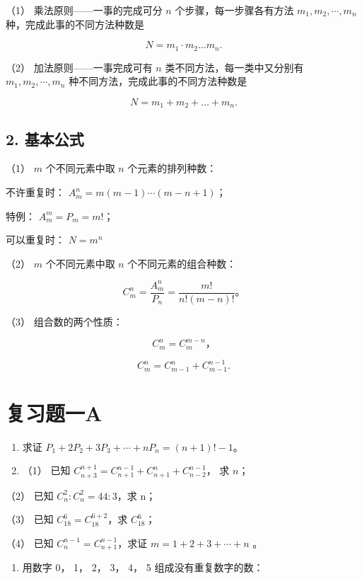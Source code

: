 （1） 乘法原则------一事的完成可分 \(n\) 个步骤，每一步骤各有方法
\(m_{1}, m_{2}, \cdots, m_{n}\) 种，完成此事的不同方法种数是

\[
N = m _ {1} \cdot m _ {2} \dots m _ {n}.
\]

（2） 加法原则------一事完成可有 \(n\) 类不同方法，每一类中又分别有
\(m_{1}, m_{2}, \cdots, m_{n}\) 种不同方法，完成此事的不同方法种数是

\[
N = m _ {1} + m _ {2} + \dots + m _ {n}.
\]

\subsection{2. 基本公式}

（1） \(m\) 个不同元素中取 \(n\) 个元素的排列种数：

不许重复时： \(A_{m}^{n}=m(m-1)\cdots(m-n+1)\)；

特例： \(A_{m}^{m}=P_{m}=m!\)；

可以重复时： \(N = m^n\)

（2） \(m\) 个不同元素中取 \(n\) 个不同元素的组合种数：

\[
C_m^n=\frac{A_m^n}{P_n}=\frac{m!}{n!(m-n)!}\text{。}
\]

（3） 组合数的两个性质：

\[
C _ {m} ^ {n} = C _ {m} ^ {m - n}\text{，}
\]

\[
C _ {m} ^ {n} = C _ {m - 1} ^ {n} + C _ {m - 1} ^ {n - 1}.
\]

\section{复习题一A}

\begin{enumerate}
\item
  求证 \(P_{1} + 2P_{2} + 3P_{3} + \cdots + nP_{n} = (n + 1)! - 1\)。
\item
  （1） 已知
  \(C_{n+3}^{n+1} = C_{n+1}^{n-1} + C_{n+1}^{n} + C_{n-2}^{n-1}\)， 求
  \(n\)；
\end{enumerate}

（2） 已知 \(C_{n}^{2}:C_{n}^{2}=44:3\)，求 n；

（3） 已知 \(C_{18}^{6}=C_{18}^{6+2}\)，求 \(C_{18}^{6}\)；

（4） 已知 \(C_{n}^{n-1}=C_{n+1}^{n-1}\)，求证 \(m=1+2+3+\cdots+n\) 。

\begin{enumerate}[start=3]
\item
  用数字 0， 1， 2， 3， 4， 5 组成没有重复数字的数：
\end{enumerate}

